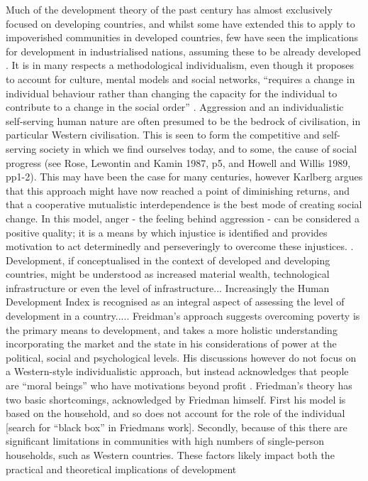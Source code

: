 Much of the development theory of the past century has almost exclusively focused on developing countries, and whilst some have extended this to apply to impoverished communities in developed countries, few have seen the implications for development in industrialised nations, assuming these to be already developed \citep{Vakil2001}.
It is in many respects a methodological individualism, even though it proposes to account for culture, mental models and social networks, “requires a change in individual behaviour rather than changing the capacity for the individual to contribute to a change in the social order” \citep[p33-34]{Biccum2016}.
Aggression and an individualistic self-serving human nature are often presumed to be the bedrock of civilisation, in particular Western civilisation. This is seen to form the competitive and self-serving society in which we find ourselves today, and to some, the cause of social progress (see Rose, Lewontin and Kamin 1987, p5, and Howell and Willis 1989, pp1-2). This may have been the case for many centuries, however Karlberg argues that this approach might have now reached a point of diminishing returns, and that a cooperative mutualistic interdependence is the best mode of creating social change. In this model, anger - the feeling behind aggression - can be considered a positive quality; it is a means by which injustice is identified and provides motivation to act determinedly and perseveringly to overcome these injustices. \citep{Karlberg2005}. Development, if conceptualised in the context of developed and developing countries, might be understood as increased material wealth, technological infrastructure or even the level of infrastructure... Increasingly the Human Development Index is recognised as an integral aspect of assessing the level of development in a country.....
Freidman's approach suggests overcoming poverty is the primary means to development, and takes a more holistic understanding incorporating the market and the state in his considerations of power at the political, social and psychological levels. His discussions however do not focus on a Western-style individualistic approach, but instead acknowledges that people are “moral beings” who have motivations beyond profit \citep{Vakil2001}. Friedman's theory has two basic shortcomings, acknowledged by Friedman himself. First his model is based on the household, and so does not account for the role of the individual [search for “black box” in Friedmans work]. Secondly, because of this there are significant limitations in communities with high numbers of single-person households, such as Western countries. These factors likely impact both the practical and theoretical implications of development \citep{Vakil2001} %




